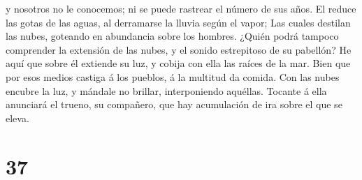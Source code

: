 y nosotros no le conocemos; ni se puede rastrear el número de sus años.
 El reduce las gotas de las aguas, al derramarse la
lluvia según el vapor;  Las cuales destilan las nubes,
goteando en abundancia sobre los hombres.  ¿Quién podrá
tampoco comprender la extensión de las nubes, y el sonido estrepitoso de
su pabellón?  He aquí que sobre él extiende su luz, y
cobija con ella las raíces de la mar.  Bien que por esos
medios castiga á los pueblos, á la multitud da comida. 
Con las nubes encubre la luz, y mándale no brillar, interponiendo
aquéllas.  Tocante á ella anunciará el trueno, su
compañero, que hay acumulación de ira sobre el que se eleva.

\hypertarget{section-36}{%
\section{37}\label{section-36}}

